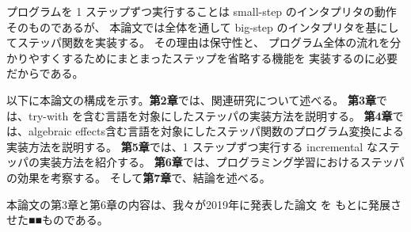 プログラムを 1 ステップずつ実行することは
small-step のインタプリタの動作そのものであるが、
本論文では全体を通して big-step のインタプリタを基にしてステッパ関数を実装する。
その理由は保守性と、
プログラム全体の流れを分かりやすくするためにまとまったステップを省略する機能を
実装するのに必要だからである。

\vspace{1cm}
以下に本論文の構成を示す。{\bf 第2章}では、関連研究について述べる。
{\bf 第3章}では、try-with を含む言語を対象にしたステッパの実装方法を説明する。
{\bf 第4章}では、algebraic effects含む言語を対象にしたステッパ関数のプログラム変換による実装方法を説明する。
{\bf 第5章}では、1 ステップずつ実行する incremental なステッパの実装方法を紹介する。
{\bf 第6章}では、プログラミング学習におけるステッパの効果を考察する。
そして{\bf 第7章}で、結論を述べる。

本論文の第3章と第6章の内容は、我々が2019年に発表した論文 \cite{FCA19} を
もとに発展させた■■ものである。

